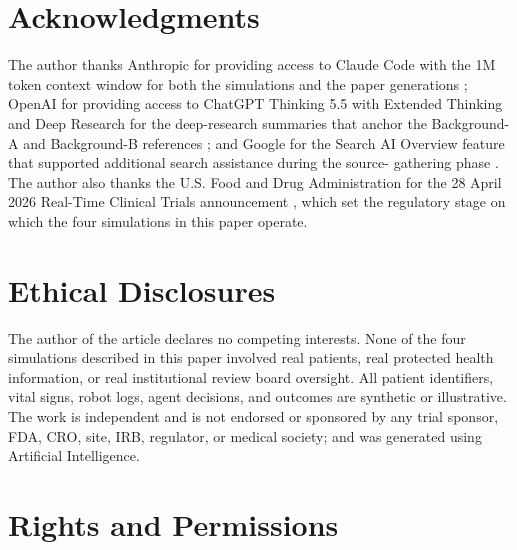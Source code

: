 
{}
\section*{Acknowledgments}
\label{sec:acknowledgments}

The author thanks Anthropic for providing access to Claude Code with
the 1M token context window for both the simulations and the paper
generations \cite{claude-code, claude-opus-47, claude-sonnet-46};
OpenAI for providing access to ChatGPT Thinking 5.5 with Extended
Thinking and Deep Research for the deep-research summaries that
anchor the Background-A and Background-B references
\cite{chatgpt-thinking}; and Google for the Search AI Overview
feature that supported additional search assistance during the source-
gathering phase \cite{google-gemini-overview}. The author also thanks
the U.S. Food and Drug Administration for the 28 April 2026 Real-Time
Clinical Trials announcement \cite{fda2026realtime}, which set the
regulatory stage on which the four simulations in this paper operate.

{}
\section*{Ethical Disclosures}
\label{sec:ethics}

The author of the article declares no competing interests. None of
the four simulations described in this paper involved real patients,
real protected health information, or real institutional review board
oversight. All patient identifiers, vital signs, robot logs, agent
decisions, and outcomes are synthetic or illustrative. The work is
independent and is not endorsed or sponsored by any trial sponsor,
FDA, CRO, site, IRB, regulator, or medical society; and was generated
using Artificial Intelligence.

{}
\section*{Rights and Permissions}
\label{sec:rights}

